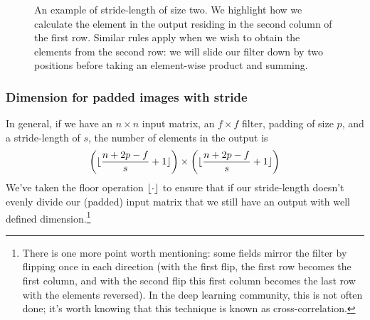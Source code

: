 \documentclass[12pt]{article}
\DeclarePairedDelimiter{\floor}{\lfloor}{\rfloor}
\begin{document}
\begin{figure}[h]
  \caption{\footnotesize An example of stride-length of size two. We highlight how we calculate the element in the output residing
in the second column of the first row. Similar rules apply when we wish to obtain the elements from the second row: we will slide our filter down by two positions
before taking an element-wise product and summing.}
\end{figure}

\subsubsection{Dimension for padded images with stride}
In general, if we have an $n \times n$ input matrix, an $f \times f$ filter, padding of size $p$, and a stride-length of $s$,
the number of elements in the output is
\begin{equation*}   \left(\floor{\frac{n + 2p - f}{s} + 1}\right) \times \left(\floor{\frac{n + 2p - f}{s} + 1}\right) \end{equation*}
We've taken the floor operation $\floor{\cdot}$ to ensure that if our stride-length doesn't evenly divide
our (padded) input matrix that we still have an output with well defined dimension.\footnote{
There is one more point worth mentioning: some fields mirror the filter by flipping once in each direction (with the first flip, the first row becomes the first column, and with the second flip this first column becomes the last row with the elements reversed). In the deep learning community, this is not often done; it's worth knowing that this technique is
known as cross-correlation.}
\end{document}
